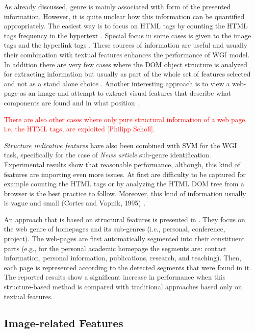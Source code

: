 As already discussed, genre is mainly associated with form of the presented information. However, it is quite unclear how this information can be quantified appropriately. The easiest way is to focus on HTML tags by counting the HTML tags frequency in the hypertext . Special focus in some cases is given to the image tags and the hyperlink tags \parencite{Lim2005,levering2008using}. These sources of information are useful and usually their combination with textual features enhances the performance of
WGI model. In addition there are very few cases where the DOM object structure is analyzed for extracting information but usually as part of the whole set of features selected and not as a stand alone choice \parencite{mehler2011integrating}. Another interesting approach is to view a web-page as an image and attempt to extract visual features that describe what components are found and in what position .

\textcolor{red}{There are also other cases where only pure structural information of a web page, i.e. the HTML tags, are exploited {[}Philipp Scholl{]}.} 

\textit{Structure indicative features} have also been combined with SVM for the WGI task, specifically for the case of \textit{News article} sub-genre identification. Experimental results show that reasonable performance, although, this kind of features are importing even more issues. At first are difficulty to be captured for example counting the HTML tags or by analyzing the HTML DOM tree from a browser is the best practice to follow. Moreover, this kind of information usually is vague and small (Cortes and Vapnik, 1995) .

An approach that is based on structural features is presented in . They focus on the web genre of homepages and its sub-genres (i.e., personal, conference, project). The web-pages are first automatically segmented into their constituent parts (e.g., for the personal academic homepage the segments are: contact information, personal information, publications, research, and teaching). Then, each page is represented according to the detected segments that were found in it. The reported results show a significant increase in performance when this structure-based method is compared with traditional approaches based only on textual features.

\subsection{Image-related Features} 

